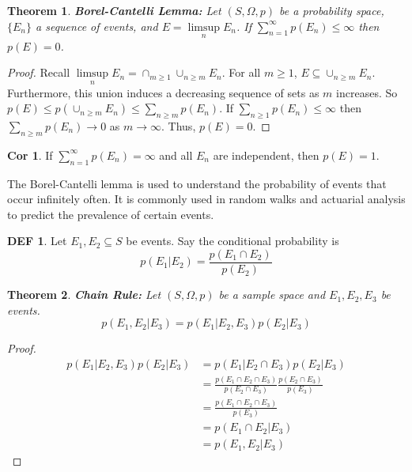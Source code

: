 \documentclass{article}
\newtheorem{theorem}{Theorem}
\theoremstyle{definition}\newtheorem{definition}{DEF}
\theoremstyle{definition}\newtheorem{example}{Ex}
\theoremstyle{lemma}\newtheorem{lemma}{Lemma}
\theoremstyle{corrolary}\newtheorem{corrolary}{Cor}
\begin{document}
\begin{theorem}\label{borel_cantelli}
\textbf{Borel-Cantelli Lemma:}
Let $(S, \Omega, p)$ be a probability space, $\{ E_n \}$ a sequence of events, and $E = \limsup\limits_{n} E_n$.
If $\sum_{n=1}^\infty p(E_n) \leq \infty$ then $p(E) = 0$.
\end{theorem}
\begin{proof}
Recall $\limsup\limits_{n} E_n = \cap_{m \geq 1} \cup_{n \geq m} E_n$.
For all $m \geq 1$, $E \subseteq \cup_{n \geq m} E_n$.
Furthermore, this union induces a decreasing sequence of sets as $m$ increases.
So $p(E) \leq p(\cup_{n \geq m} E_n) \leq \sum_{n\geq m} p(E_n)$.
If $\sum_{n\geq 1} p(E_n) \leq \infty$ then $\sum_{n\geq m} p(E_n) \rightarrow 0$ as $m \rightarrow \infty$.
Thus, $p(E)=0$.
\end{proof}
\begin{corrolary}
If $\sum_{n=1}^\infty p(E_n) = \infty$ and all $E_n$ are independent, then $p(E) = 1$.
\end{corrolary}

The Borel-Cantelli lemma is used to understand the probability of events that occur infinitely often. 
It is commonly used in random walks and actuarial analysis to predict the prevalence of certain events.

\begin{definition}
Let $E_1, E_2 \subseteq S$ be events. Say the conditional probability is 
\begin{equation}
p(E_1 | E_2) = \frac{p(E_1 \cap E_2 )}{p(E_2)}
\end{equation}
\end{definition}

\begin{theorem}
\textbf{Chain Rule:}
Let $(S, \Omega, p)$ be a sample space and $E_1, E_2, E_3$ be events.
\begin{equation}
p(E_1,E_2|E_3)=p(E_1|E_2,E_3)p(E_2|E_3)
\end{equation}
\end{theorem}
\begin{proof}
\begin{align*}
p(E_1| E_2 , E_3) p(E_2 | E_3) &= p(E_1 | E_2 \cap E_3) p(E_2 | E_3) \\
&= \frac{p(E_1 \cap E_2 \cap E_3 )}{p(E_2 \cap E_3)} \frac{p(E_2 \cap E_3)}{p(E_3)} \\
&= \frac{p(E_1 \cap E_2 \cap E_3)}{p(E_3)} \\
&= p(E_1 \cap E_2 | E_3) \\
&= p(E_1, E_2 | E_3)
\end{align*}
\end{proof}
\end{document}

